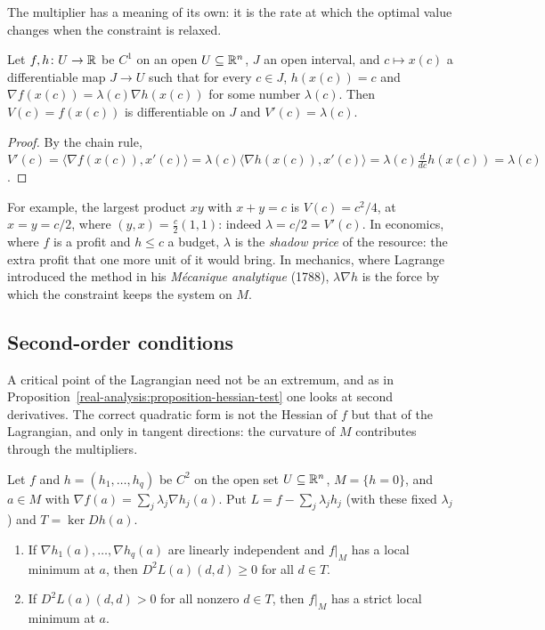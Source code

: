 The multiplier has a meaning of its own: it is the rate at which the optimal value changes when the constraint is relaxed.

\begin{proposition}\label{real-analysis:proposition-multiplier-sensitivity}
Let $f, h \colon U \to \mathbb{R}$ be $C^1$ on an open $U \subseteq \mathbb{R}^n$, $J$ an open interval, and $c \mapsto x(c)$ a differentiable map $J \to U$ such that for every $c \in J$, $h(x(c)) = c$ and
$\nabla f(x(c)) = \lambda(c)\nabla h(x(c))$ for some number $\lambda(c)$. Then $V(c) = f(x(c))$ is differentiable on $J$ and $V'(c) = \lambda(c)$.
\end{proposition}

\begin{proof}
By the chain rule, $V'(c) = \langle\nabla f(x(c)), x'(c)\rangle = \lambda(c)\langle\nabla h(x(c)), x'(c)\rangle = \lambda(c)\frac{d}{dc}h(x(c)) = \lambda(c)$.
\end{proof}

For example, the largest product $xy$ with $x + y = c$ is $V(c) = c^2/4$, at $x = y = c/2$, where $(y, x) = \frac c2(1, 1)$: indeed $\lambda = c/2 = V'(c)$. In economics, where $f$ is a profit and $h \leq c$ a
budget, $\lambda$ is the \emph{shadow price} of the resource: the extra profit that one more unit of it would bring. In mechanics, where Lagrange introduced the method in his \emph{M\'ecanique
analytique} (1788), $\lambda\nabla h$ is the force by which the constraint keeps the system on $M$.

\subsection{Second-order conditions}\label{real-analysis:subsection-second-order}

A critical point of the Lagrangian need not be an extremum, and as in Proposition~\ref{real-analysis:proposition-hessian-test} one looks at second derivatives. The correct quadratic form is
not the Hessian of $f$ but that of the Lagrangian, and only in tangent directions: the curvature of $M$ contributes through the multipliers.

\begin{theorem}\label{real-analysis:theorem-lagrange-second-order}
Let $f$ and $h = (h_1, \ldots, h_q)$ be $C^2$ on the open set $U \subseteq \mathbb{R}^n$, $M = \{h = 0\}$, and $a \in M$ with $\nabla f(a) = \sum_j\lambda_j\nabla h_j(a)$. Put
$L = f - \sum_j\lambda_jh_j$ (with these fixed $\lambda_j$) and $T = \ker Dh(a)$.
\begin{enumerate}
\item If $\nabla h_1(a), \ldots, \nabla h_q(a)$ are linearly independent and $f|_M$ has a local minimum at $a$, then $D^2L(a)(d, d) \geq 0$ for all $d \in T$.
\item If $D^2L(a)(d, d) > 0$ for all nonzero $d \in T$, then $f|_M$ has a strict local minimum at $a$.
\end{enumerate}
\end{theorem}

